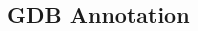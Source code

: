 \documentclass[class=book, crop=false]{standalone}
\begin{document}
\begin{CJK}{UTF8}{gbsn}

\chapter{GDB Annotation}

















\cleardoublepage

\end{CJK}
\end{document}
